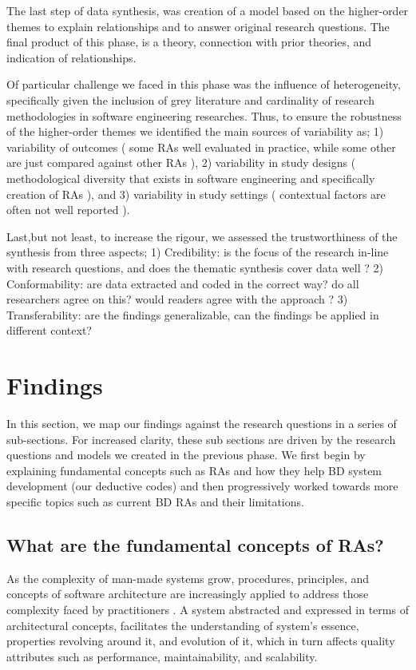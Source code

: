\documentclass[review]{elsarticle}
\begin{document}
The last step of data synthesis, was creation of a model based on the higher-order themes to explain relationships and to answer original research questions. The final product of this phase, is a theory, connection with prior theories, and indication of relationships. 

Of particular challenge we faced in this phase was the influence of heterogeneity, specifically given the inclusion of grey literature and cardinality of research methodologies in software engineering researches. Thus, to ensure the robustness of the higher-order themes we identified the main sources of variability as; 1) variability of outcomes ( some RAs well evaluated in practice, while some other are just compared against other RAs ), 2) variability in study designs ( methodological diversity that exists in software engineering and specifically creation of RAs ), and 3) variability in study settings ( contextual factors are often not well reported ).

Last,but not least, to increase the rigour, we assessed the trustworthiness of the synthesis from three aspects; 1) Credibility: is the focus of the research in-line with research questions, and does the thematic synthesis cover data well ? 2) Conformability: are data extracted and coded in the correct way? do all researchers agree on this? would readers agree with the approach ? 3) Transferability: are the findings generalizable, can the findings be applied in different context? 

\section{Findings}

In this section, we map our findings against the research questions in a series of sub-sections. For increased clarity, these sub sections are driven by the research questions and models we created in the previous phase. We first begin by explaining fundamental concepts such as RAs and how they help BD system development (our deductive codes) and then progressively worked towards more specific topics such as current BD RAs and their limitations.

\subsection{What are the fundamental concepts of RAs?}

As the complexity of man-made systems grow, procedures, principles, and concepts of software architecture are increasingly applied to address those complexity faced by practitioners \cite{AtaeiACIS}. A system abstracted and expressed in terms of architectural concepts, facilitates the understanding of system’s essence, properties revolving around it, and evolution of it, which in turn affects quality attributes such as performance, maintainability, and scalability. 
\end{document}
